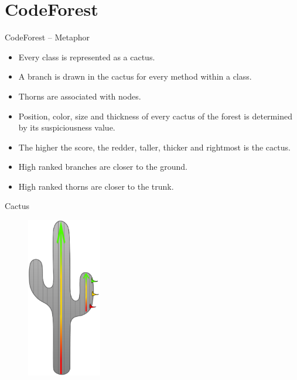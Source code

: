 \documentclass[handout]{beamer}
\begin{document}
\section{CodeForest}

\begin{frame}
    \sectionpage
\end{frame}

\begin{frame}{CodeForest -- Metaphor}
    \begin{itemize}
        \item Every class is represented as a cactus.
        \item A branch is drawn in the cactus for every method within a class.
        \item Thorns are associated with nodes.
        \item Position, color, size and thickness of every cactus of the forest
        is determined by its suspiciousness value.
        \item The higher the score, the redder, taller, thicker and rightmost is
        the cactus.
        \item High ranked branches are closer to the ground.
        \item High ranked thorns are closer to the trunk.
     \end{itemize}
\end{frame}

\begin{frame}{Cactus}
    \begin{figure}
        \centering
        \includegraphics[height=7cm]{../figures/internal_metaphor}
    \end{figure}
\end{frame}
\end{document}
